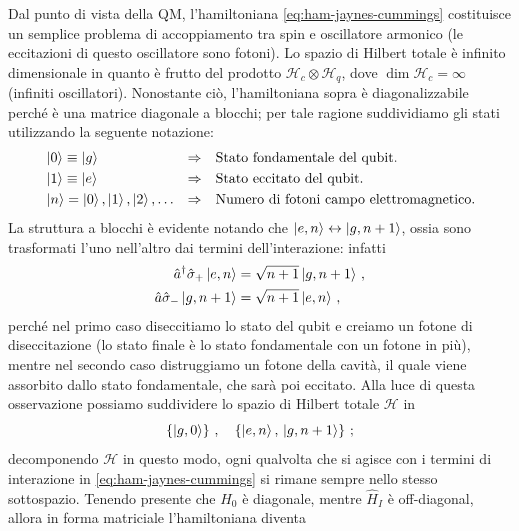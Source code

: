 \noindent Dal punto di vista della QM, l'hamiltoniana \eqref{eq:ham-jaynes-cummings} costituisce un semplice problema di accoppiamento tra spin e oscillatore armonico (le eccitazioni di questo oscillatore sono fotoni). Lo spazio di Hilbert totale è infinito dimensionale in quanto è frutto del prodotto $\mathcal{H}_c \otimes \mathcal{H}_q$, dove $\dim \mathcal{H}_c = \infty$ (infiniti oscillatori). Nonostante ciò, l'hamiltoniana sopra è diagonalizzabile perché è una matrice diagonale a blocchi; per tale ragione suddividiamo gli stati utilizzando la seguente notazione:
\begin{align*}
    &\ket{0} \equiv \ket{g} &\Rightarrow& &&\text{Stato fondamentale del qubit.} \\
    &\ket{1} \equiv \ket{e} &\Rightarrow& &&\text{Stato eccitato del qubit.} \\
    &\ket{n} = \ket{0}, \ket{1}, \ket{2}, \ldots &\Rightarrow& &&\text{Numero di fotoni campo elettromagnetico.}
\end{align*}
La struttura a blocchi è evidente notando che $\ket{e,n} \leftrightarrow \ket{g,n+1}$, ossia sono trasformati l'uno nell'altro dai termini dell'interazione: infatti
\begin{align*}
    \hat a^\dagger \hat \sigma_+ \ket{e,n} &= \sqrt{n+1} \ket{g,n+1} \, , \\
    \hat a \hat \sigma_- \ket{g, n+1} &= \sqrt{n+1} \ket{e,n} \, ,
\end{align*}
perché nel primo caso diseccitiamo lo stato del qubit e creiamo un fotone di diseccitazione (lo stato finale è lo stato fondamentale con un fotone in più), mentre nel secondo caso distruggiamo un fotone della cavità, il quale viene assorbito dallo stato fondamentale, che sarà poi eccitato. Alla luce di questa osservazione possiamo suddividere lo spazio di Hilbert totale $\mathcal{H}$ in
\begin{equation}\label{CQED_states}
    \left\{\ket{g,0}\right\} \, , \quad \left\{ \ket{e,n}, \, \ket{g,n+1}\right\} \, ;
\end{equation}
decomponendo $\mathcal{H}$ in questo modo, ogni qualvolta che si agisce con i termini di interazione in \eqref{eq:ham-jaynes-cummings} si rimane sempre nello stesso sottospazio. Tenendo presente che $\hat{H}_0$ è diagonale, mentre $\hat{H}_I$ è off-diagonal, allora in forma matriciale l'hamiltoniana diventa

